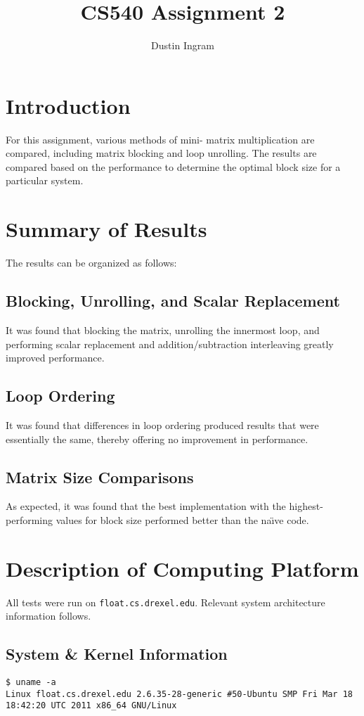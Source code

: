 \documentclass{article}
\title{CS540 Assignment 2}
\author{Dustin Ingram}
\begin{document}
\maketitle
\newpage
\section{Introduction}
For this assignment, various methods of mini- matrix multiplication are compared, including matrix blocking and loop unrolling. The results are compared based on the performance to determine the optimal block size for a particular system.
\section{Summary of Results}
The results can be organized as follows:
\subsection{Blocking, Unrolling, and Scalar Replacement}
It was found that blocking the matrix, unrolling the innermost loop, and performing scalar replacement and addition/subtraction interleaving greatly improved performance. 
\subsection{Loop Ordering}
It was found that differences in loop ordering produced results that were essentially the same, thereby offering no improvement in performance.
\subsection{Matrix Size Comparisons}
As expected, it was found that the best implementation with the highest-performing values for block size performed better than the na\"{\i}ve code.
\section{Description of Computing Platform}
All tests were run on \texttt{float.cs.drexel.edu}. Relevant system architecture information follows.
\subsection{System \& Kernel Information}
\begin{lstlisting}
$ uname -a
Linux float.cs.drexel.edu 2.6.35-28-generic #50-Ubuntu SMP Fri Mar 18 18:42:20 UTC 2011 x86_64 GNU/Linux
\end{lstlisting}
\end{document}
